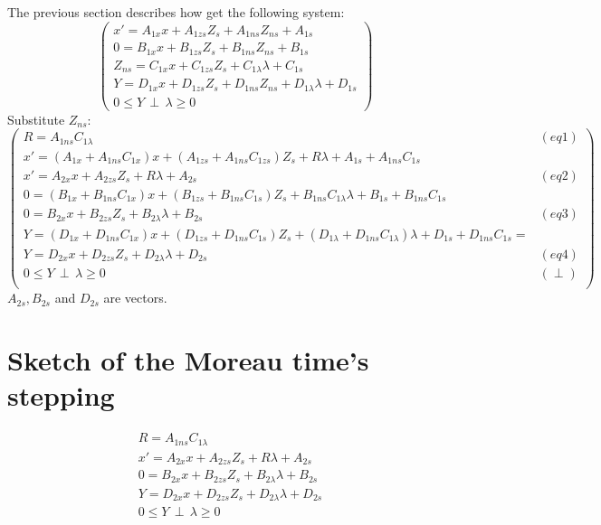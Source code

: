The previous section describes how get the following system:
\[\left(\begin{array}{c}
x'=A_{1x}x +A_{1zs}Z_{s} + A_{1ns}Z_{ns}+A_{1s}\\
0=B_{1x}x+B_{1zs}Z_{s} + B_{1ns}Z_{ns}+B_{1s}\\
Z_{ns}= C_{1x}x+C_{1zs}Z_{s}+C_{1\lambda}\lambda +C_{1s}\\
Y=D_{1x}x +D_{1zs}Z_{s}+D_{1ns}Z_{ns}+D_{1\lambda}\lambda+D_{1s}\\
0 \leq Y \, \perp \, \lambda \geq 0
\end{array}\right)\]
Substitute $Z_{ns}$:
\[\left(\begin{array}{cc}
R=A_{1ns}C_{1\lambda}&(eq1)\\
x'=(A_{1x}+A_{1ns}C_{1x})x +(A_{1zs}+A_{1ns}C_{1zs})Z_{s} +R\lambda+A_{1s} + A_{1ns}C_{1s}\\
x'=A_{2x}x +A_{2zs}Z_{s} +R \lambda +A_{2s}&(eq2)\\
0=(B_{1x}+B_{1ns}C_{1x})x+(B_{1zs}+B_{1ns}C_{1s})Z_{s} + B_{1ns}C_{1\lambda}\lambda +B_{1s} + B_{1ns}C_{1s} \\
0=B_{2x}x+B_{2zs}Z_{s} + B_{2\lambda}\lambda + B_{2s}&(eq3)\\
Y=(D_{1x}+D_{1ns}C_{1x})x+(D_{1zs}+D_{1ns}C_{1s})Z_{s}+(D_{1\lambda}+D_{1ns}C_{1\lambda})\lambda +D_{1s}+D_{1ns}C_{1s}=\\
Y=D_{2x}x+D_{2zs}Z_{s}+D_{2\lambda}\lambda + D_{2s} &(eq4)\\
0 \leq Y \, \perp \, \lambda \geq 0&(\perp)\\
\end{array}\right)\]
$A_{2s}, B_{2s}$ and $D_{2s}$ are vectors.

\section{Sketch of  the Moreau time's stepping }
\begin{eqnarray}
R=A_{1ns}C_{1\lambda}\label{eq1}\\
x'=A_{2x}x +A_{2zs}Z_{s} +R \lambda +A_{2s}&\label{eq2}\\
0=B_{2x}x+B_{2zs}Z_{s} + B_{2\lambda}\lambda + B_{2s}&\label{eq3}\\
Y=D_{2x}x+D_{2zs}Z_{s}+D_{2\lambda}\lambda + D_{2s} &\label{eq4}\\
0 \leq Y \, \perp \, \lambda \geq 0&\label{eqperp}\\
\end{eqnarray}



